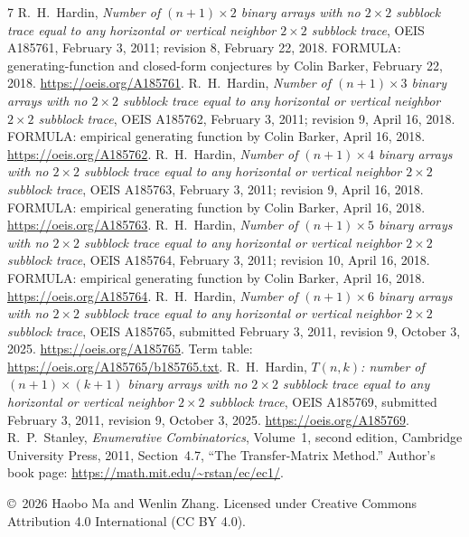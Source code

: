 \documentclass[11pt]{article}
\begin{document}
\clearpage
\begin{thebibliography}{7}
R.\ H.\ Hardin, \emph{Number of $(n+1)\times2$ binary arrays with no
$2\times2$ subblock trace equal to any horizontal or vertical neighbor
$2\times2$ subblock trace}, OEIS A185761, February 3, 2011;
revision 8, February 22, 2018. FORMULA: generating-function and
closed-form conjectures by Colin Barker, February 22, 2018.
\url{https://oeis.org/A185761}.
R.\ H.\ Hardin, \emph{Number of $(n+1)\times3$ binary arrays with no
$2\times2$ subblock trace equal to any horizontal or vertical neighbor
$2\times2$ subblock trace}, OEIS A185762, February 3, 2011;
revision 9, April 16, 2018. FORMULA: empirical generating function
by Colin Barker, April 16, 2018. \url{https://oeis.org/A185762}.
R.\ H.\ Hardin, \emph{Number of $(n+1)\times4$ binary arrays with no
$2\times2$ subblock trace equal to any horizontal or vertical neighbor
$2\times2$ subblock trace}, OEIS A185763, February 3, 2011;
revision 9, April 16, 2018. FORMULA: empirical generating function
by Colin Barker, April 16, 2018. \url{https://oeis.org/A185763}.
R.\ H.\ Hardin, \emph{Number of $(n+1)\times5$ binary arrays with no
$2\times2$ subblock trace equal to any horizontal or vertical neighbor
$2\times2$ subblock trace}, OEIS A185764, February 3, 2011;
revision 10, April 16, 2018. FORMULA: empirical generating function
by Colin Barker, April 16, 2018. \url{https://oeis.org/A185764}.
R.\ H.\ Hardin, \emph{Number of $(n+1)\times6$ binary arrays with no
$2\times2$ subblock trace equal to any horizontal or vertical neighbor
$2\times2$ subblock trace}, OEIS A185765, submitted February 3, 2011,
revision 9, October 3, 2025. \url{https://oeis.org/A185765}.
Term table: \url{https://oeis.org/A185765/b185765.txt}.
R.\ H.\ Hardin, \emph{$T(n,k)$: number of $(n+1)\times(k+1)$ binary
arrays with no $2\times2$ subblock trace equal to any horizontal or vertical
neighbor $2\times2$ subblock trace},
OEIS A185769, submitted February 3, 2011, revision 9, October 3, 2025.
\url{https://oeis.org/A185769}.
R.\ P.\ Stanley, \emph{Enumerative Combinatorics}, Volume~1, second edition,
Cambridge University Press, 2011, Section~4.7, ``The Transfer-Matrix Method.''
Author's book page: \url{https://math.mit.edu/~rstan/ec/ec1/}.
\end{thebibliography}
\smallskip
\noindent\small \copyright\ 2026 Haobo Ma and Wenlin Zhang.
Licensed under Creative Commons Attribution 4.0 International (CC BY 4.0).
\end{document}
